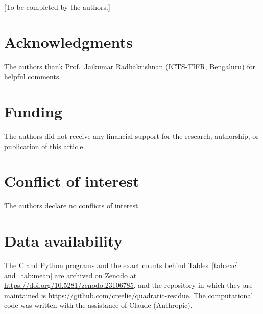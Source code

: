 \documentclass[11pt]{article}
\theoremstyle{definition}
\begin{document}
[To be completed by the authors.]

\section*{Acknowledgments}

The authors thank Prof.\ Jaikumar Radhakrishnan (ICTS-TIFR, Bengaluru) for helpful comments.

\section*{Funding}

The authors did not receive any financial support for the research, authorship, or publication of this article.

\section*{Conflict of interest}

The authors declare no conflicts of interest.

\section*{Data availability}

The C and Python programs and the exact counts behind Tables~\ref{tab:exc} and~\ref{tab:mean} are archived on Zenodo at \url{https://doi.org/10.5281/zenodo.23106785}, and the repository in which they are maintained is \url{https://github.com/creelie/quadratic-residue}. The computational code was written with the assistance of Claude (Anthropic).
\end{document}
